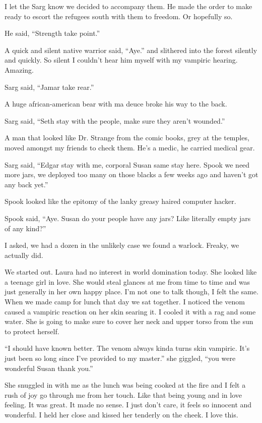 \parasep

I let the Sarg know we decided to accompany them. He made the order to make ready to escort the refugees south with them to freedom. Or hopefully so.

He said, ``Strength take point.''

A quick and silent native warrior said, ``Aye.'' and slithered into the forest silently and quickly. So silent I couldn't hear him myself with my vampiric hearing. Amazing.

Sarg said, ``Jamar take rear.''

A huge african-american bear with ma deuce broke his way to the back.

Sarg said, ``Seth stay with the people, make sure they aren't wounded.''

A man that looked like Dr. Strange from the comic books, grey at the temples, moved amongst my friends to check them. He's a medic, he carried medical gear.

Sarg said, ``Edgar stay with me, corporal Susan same stay here. Spook we need more jars, we deployed too many on those blacks a few weeks ago and haven't got any back yet.''

Spook looked like the epitomy of the lanky greasy haired computer hacker.

Spook said, ``Aye. Susan do your people have any jars? Like literally empty jars of any kind?''

I asked, we had a dozen in the unlikely case we found a warlock. Freaky, we actually did.

We started out. Laura had no interest in world domination today. She looked like a teenage girl in love. She would steal glances at me from time to time and was just generally in her own happy place. I'm not one to talk though, I felt the same. When we made camp for lunch that day we sat together. I noticed the venom caused a vampiric reaction on her skin searing it. I cooled it with a rag and some water. She is going to make sure to cover her neck and upper torso from the sun to protect herself.

``I should have known better. The venom always kinda turns skin vampiric. It's just been so long since I've provided to my master.'' she giggled, ``you were wonderful Susan thank you.''

She snuggled in with me as the lunch was being cooked at the fire and I felt a rush of joy go through me from her touch. Like that being young and in love feeling. It was great. It made no sense. I just don't care, it feels so innocent and wonderful. I held her close and kissed her tenderly on the cheek. I love this.

